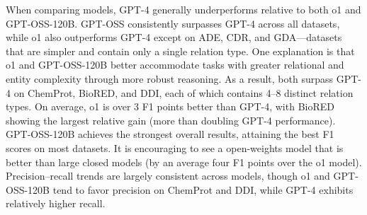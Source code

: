 \documentclass[11pt]{article}
\begin{document}
When comparing models, GPT-4 generally underperforms relative to both o1 and GPT-OSS-120B. GPT-OSS consistently surpasses GPT-4 across all datasets, while o1 also outperforms GPT-4 except on ADE, CDR, and GDA—datasets that are simpler and contain only a single relation type. One explanation is that o1 and GPT-OSS-120B better accommodate tasks with greater relational and entity complexity through more robust reasoning. As a result, both surpass GPT-4 on ChemProt, BioRED, and DDI, each of which contains 4–8 distinct relation types. On average, o1 is over 3 F1 points better than GPT-4, with BioRED showing the largest relative gain (more than doubling GPT-4 performance). GPT-OSS-120B achieves the strongest overall results, attaining the best F1 scores on most datasets. It is encouraging to see a open-weights model that is better than large closed models (by an average four F1 points over the o1 model). Precision–recall trends are largely consistent across models, though o1 and GPT-OSS-120B tend to favor precision on ChemProt and DDI, while GPT-4 exhibits relatively higher recall.
\end{document}
